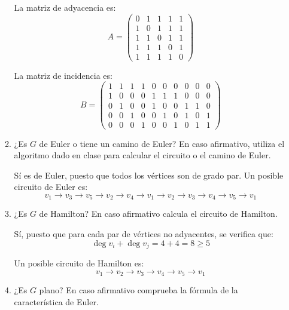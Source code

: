 \begin{ejercicio}
\begin{enumerate}
\begin{enumerate}
            La matriz de adyacencia es:
            \[
                A=\begin{pmatrix}
                    0 & 1 & 1 & 1 & 1 \\
                    1 & 0 & 1 & 1 & 1 \\
                    1 & 1 & 0 & 1 & 1 \\
                    1 & 1 & 1 & 0 & 1 \\
                    1 & 1 & 1 & 1 & 0
                \end{pmatrix}
            \]

            La matriz de incidencia es:
            \[
                B=\begin{pmatrix}
                    1 & 1 & 1 & 1 & 0 & 0 & 0 & 0 & 0 & 0 \\
                    1 & 0 & 0 & 0 & 1 & 1 & 1 & 0 & 0 & 0 \\
                    0 & 1 & 0 & 0 & 1 & 0 & 0 & 1 & 1 & 0 \\
                    0 & 0 & 1 & 0 & 0 & 1 & 0 & 1 & 0 & 1 \\
                    0 & 0 & 0 & 1 & 0 & 0 & 1 & 0 & 1 & 1
                \end{pmatrix}
            \]
            \item ¿Es $G$ de Euler o tiene un camino de Euler? En caso afirmativo, utiliza el algoritmo dado en clase para calcular el circuito o el camino de Euler.
            
            Sí es de Euler, puesto que todos los vértices son de grado par. Un posible circuito de Euler es:
            \begin{equation*}
                v_1\to v_3\to v_5\to v_2\to v_4\to v_1\to v_2\to v_3\to v_4\to v_5\to v_1
            \end{equation*}
            \item ¿Es $G$ de Hamilton? En caso afirmativo calcula el circuito de Hamilton.
            
            Sí, puesto que para cada par de vértices no adyacentes, se verifica que:
            \begin{equation*}
                \deg v_i + \deg v_j = 4 + 4 = 8 \geq 5
            \end{equation*}

            Un posible circuito de Hamilton es:
            \begin{equation*}
                v_1\to v_2\to v_3\to v_4\to v_5\to v_1
            \end{equation*}
            \item ¿Es $G$ plano? En caso afirmativo comprueba la fórmula de la característica de Euler.
            

\end{enumerate}
\end{enumerate}
\end{ejercicio}
